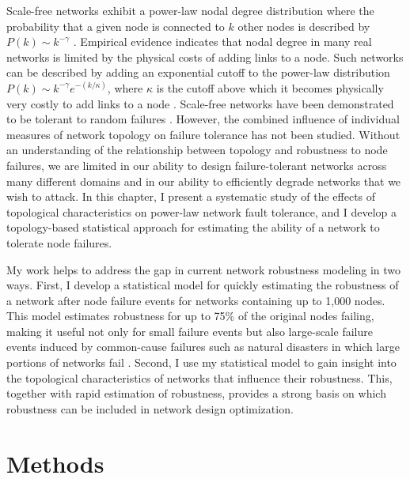Scale-free networks exhibit a power-law nodal degree distribution where the probability that a given node is connected to $k$ other nodes is described by $P(k) \sim k^{-\gamma}$ \cite{Barabasi1999}. Empirical evidence indicates that nodal degree in many real networks is limited by the physical costs of adding links to a node. Such networks can be described by adding an exponential cutoff to the power-law distribution $P(k) \sim k^{-\gamma}e^{-(k/\kappa)}$, where $\kappa$ is the cutoff above which it becomes physically very costly to add links to a node \cite{Amaral2000,Jeong2000,Newman2001,Clauset2009}. Scale-free networks have been demonstrated to be tolerant to random failures \cite{Albert2000}. However, the combined influence of individual measures of network topology on failure tolerance has not been studied. Without an understanding of the relationship between topology and robustness to node failures, we are limited in our ability to design failure-tolerant networks across many different domains and in our ability to efficiently degrade networks that we wish to attack. In this chapter, I present a systematic study of the effects of topological characteristics on power-law network fault tolerance, and I develop a topology-based statistical approach for estimating the ability of a network to tolerate node failures.

My work helps to address the gap in current network robustness modeling in two ways. First, I develop a statistical model for quickly estimating the robustness of a network after node failure events for networks containing up to 1,000 nodes. This model estimates robustness for up to 75\% of the original nodes failing, making it useful not only for small failure events but also large-scale failure events induced by common-cause failures such as natural disasters in which large portions of networks fail \cite{Han2009a, Han2009b, Guikema2010, Nateghi2011}. Second, I use my statistical model to gain insight into the topological characteristics of networks that influence their robustness. This, together with rapid estimation of robustness, provides a strong basis on which robustness can be included in network design optimization.


\section{Methods}
\label{sec:ch2:methods}

